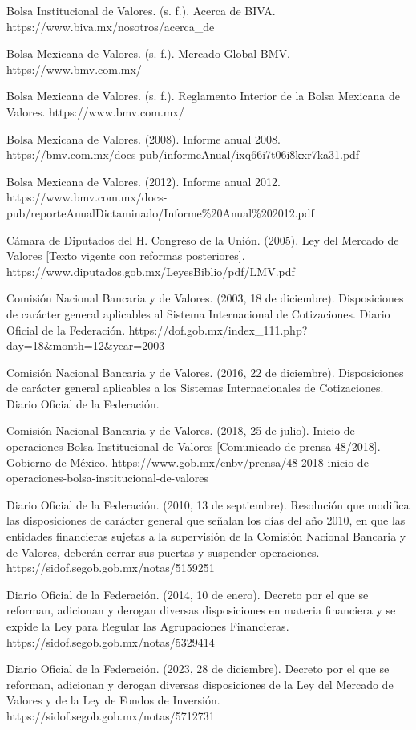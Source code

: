 \begin{referencias}
Bolsa Institucional de Valores. (s. f.). Acerca de BIVA. https://www.biva.mx/nosotros/acerca\_de

Bolsa Mexicana de Valores. (s. f.). Mercado Global BMV. https://www.bmv.com.mx/

Bolsa Mexicana de Valores. (s. f.). Reglamento Interior de la Bolsa Mexicana de Valores. https://www.bmv.com.mx/

Bolsa Mexicana de Valores. (2008). Informe anual 2008. https://bmv.com.mx/docs-pub/informeAnual/ixq66i7t06i8kxr7ka31.pdf

Bolsa Mexicana de Valores. (2012). Informe anual 2012. https://www.bmv.com.mx/docs-pub/reporteAnualDictaminado/Informe\%20Anual\%202012.pdf

Cámara de Diputados del H. Congreso de la Unión. (2005). Ley del Mercado de Valores {[}Texto vigente con reformas posteriores{]}. https://www.diputados.gob.mx/LeyesBiblio/pdf/LMV.pdf

Comisión Nacional Bancaria y de Valores. (2003, 18 de diciembre). Disposiciones de carácter general aplicables al Sistema Internacional de Cotizaciones. Diario Oficial de la Federación. https://dof.gob.mx/index\_111.php?day=18\&month=12\&year=2003

Comisión Nacional Bancaria y de Valores. (2016, 22 de diciembre). Disposiciones de carácter general aplicables a los Sistemas Internacionales de Cotizaciones. Diario Oficial de la Federación.

Comisión Nacional Bancaria y de Valores. (2018, 25 de julio). Inicio de operaciones Bolsa Institucional de Valores {[}Comunicado de prensa 48/2018{]}. Gobierno de México. https://www.gob.mx/cnbv/prensa/48-2018-inicio-de-operaciones-bolsa-institucional-de-valores

Diario Oficial de la Federación. (2010, 13 de septiembre). Resolución que modifica las disposiciones de carácter general que señalan los días del año 2010, en que las entidades financieras sujetas a la supervisión de la Comisión Nacional Bancaria y de Valores, deberán cerrar sus puertas y suspender operaciones. https://sidof.segob.gob.mx/notas/5159251

Diario Oficial de la Federación. (2014, 10 de enero). Decreto por el que se reforman, adicionan y derogan diversas disposiciones en materia financiera y se expide la Ley para Regular las Agrupaciones Financieras. https://sidof.segob.gob.mx/notas/5329414

Diario Oficial de la Federación. (2023, 28 de diciembre). Decreto por el que se reforman, adicionan y derogan diversas disposiciones de la Ley del Mercado de Valores y de la Ley de Fondos de Inversión. https://sidof.segob.gob.mx/notas/5712731


\end{referencias}
